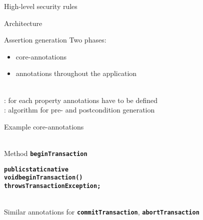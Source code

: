 \documentclass[final,nocolorBG,a4,marieke,nototal,pdf, accumulate,slideColor]{prosper}
\newcommand{\textttbf}[1]{\texttt{\textbf{#1}}}
\begin{document}
{\begin{slide}{High-level security rules}
\begin{itemize}
\end{itemize}
\end{slide}
}

\begin{slide}{Architecture}
\end{slide}

\begin{slide}{Assertion generation}
Two phases:
\begin{itemize}
\item {} core-annotations
\item {} annotations throughout the application
\end{itemize}
\ \smallskip\\
: for each property annotations have to be defined
\bigskip\\
: algorithm for pre- and postcondition generation
\end{slide}

\begin{slide}{Example core-annotations}
\begin{alltt}
\end{alltt}
\ \smallskip\\
Method \textttbf{beginTransaction}
\begin{alltt}
\textbf{public static native 
   void beginTransaction() 
        throws TransactionException;}
\end{alltt}
\ \smallskip\\
Similar annotations for \textttbf{commitTransaction},
\textttbf{abortTransaction} 
\end{slide}
\end{document}

